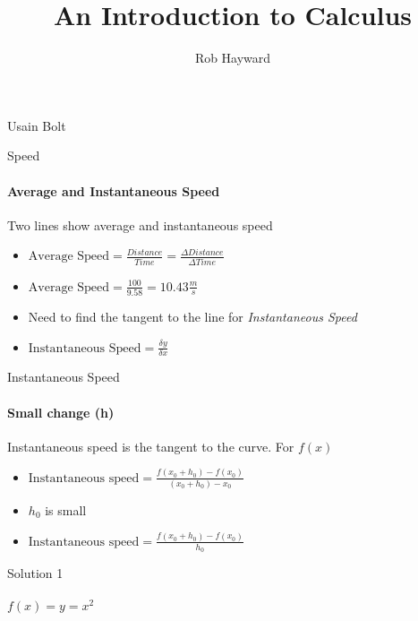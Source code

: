 \documentclass[14pt,xcolor=pdftex,dvipsnames,table]{beamer}
\title{An Introduction to Calculus}
\author{Rob Hayward}
\date{}
\begin{document}
\begin{frame}
\titlepage
\end{frame}


\begin{frame}{Usain Bolt}
\end{frame}

\begin{frame}{Speed}
\framesubtitle{Average and Instantaneous Speed}
Two lines show average and instantaneous speed
\pause
\begin{itemize}[<+-| alert@+>]
\item $\text{Average Speed} = \frac{Distance}{Time} = \frac{\Delta Distance}{\Delta Time}$
\item $\text{Average Speed} = \frac{100}{9.58} = 10.43\frac{m}{s}$
\item Need to find the tangent to the line for \emph{Instantaneous Speed}
\item $\text{Instantaneous Speed} = \frac{\delta y}{\delta x}$
\end{itemize}
\end{frame}

\begin{frame}{Instantaneous Speed}
\framesubtitle{Small change (h)}
Instantaneous speed is the tangent to the curve.  For $f(x)$
\pause
\begin{itemize}[<+-| alert@+>]
\item $\text{Instantaneous speed} = \frac{f(x_0 + h_0) - f(x_0)}{(x_0 +h_0) - 
x_0}$ 
\item $h_0$ is small
\item $\text{Instantaneous speed} = \frac{f(x_0 + h_0) - f(x_0)}{h_0}$
\end{itemize}
\end{frame}

\begin{frame}{Solution 1}
\framesubtitle{$f(x) = y = x^2$}
\end{frame}
\end{document}
